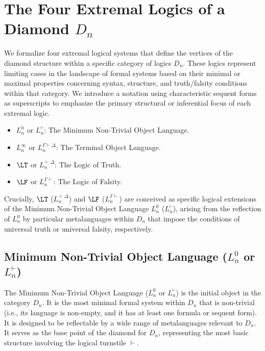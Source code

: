 																	\section{The Four Extremal Logics of a Diamond $D_n$}
																	
																	We formalize four extremal logical systems that define the vertices of the diamond structure within a specific category of logics $D_n$. These logics represent limiting cases in the landscape of formal systems based on their minimal or maximal properties concerning syntax, structure, and truth/falsity conditions within that category. We introduce a notation using characteristic sequent forms as superscripts to emphasize the primary structural or inferential focus of each extremal logic.
																	
																	\begin{itemize}
																		\item $L^0_n$ or $L^{\vdash}_n$: The Minimum Non-Trivial Object Language.
																		\item $L^\infty_n$ or $L^{\Gamma\vdash\Delta}_n$: The Terminal Object Language.
																		\item $\LT$ or $L^{\vdash\Delta}_n$: The Logic of Truth.
																		\item $\LF$ or $L^{\Gamma\vdash}_n$: The Logic of Falsity.
																	\end{itemize}
																	
																	Crucially, $\LT$ ($L^{\vdash\Delta}_n$) and $\LF$ ($L^{\Gamma\vdash}_n$) are conceived as specific logical extensions of the Minimum Non-Trivial Object Language $L^0_n$ ($L^{\vdash}_n$), arising from the reflection of $L^0_n$ by particular metalanguages within $D_n$ that impose the conditions of universal truth or universal falsity, respectively.
																	
																	\subsection{Minimum Non-Trivial Object Language ($L^0_n$ or $L^{\vdash}_n$)}
																	
																	The Minimum Non-Trivial Object Language ($L^0_n$ or $L^{\vdash}_n$) is the initial object in the category $D_n$. It is the most minimal formal system within $D_n$ that is non-trivial (i.e., its language is non-empty, and it has at least one formula or sequent form). It is designed to be reflectable by a wide range of metalanguages relevant to $D_n$. It serves as the base point of the diamond for $D_n$, representing the most basic structure involving the logical turnstile $\vdash$.
																	
